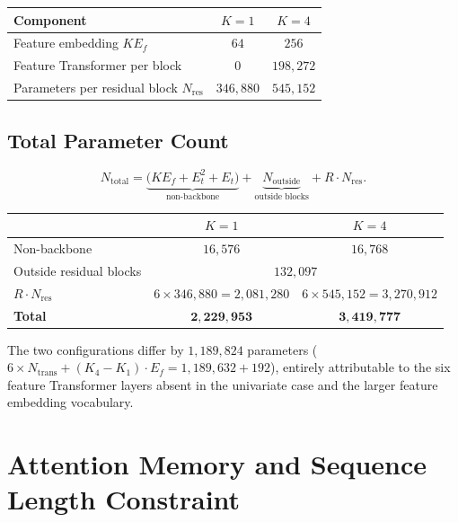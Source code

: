 \begin{table}[h]
\centering
\begin{tabular}{lcc}
\toprule
Component & $K=1$ & $K=4$ \\
\midrule
Feature embedding $K E_f$ & $64$ & $256$ \\
Feature Transformer per block & $0$ & $198{,}272$ \\
\midrule
Parameters per residual block $N_{\mathrm{res}}$ & $346{,}880$ & $545{,}152$ \\
\bottomrule
\end{tabular}
\end{table}

\subsection{Total Parameter Count}

\[
N_{\mathrm{total}}
= \underbrace{\bigl(K E_f + E_t^2 + E_t\bigr)}_{\text{non-backbone}}
+ \underbrace{N_{\mathrm{outside}}}_{\text{outside blocks}}
+ R\cdot N_{\mathrm{res}}.
\]

\begin{table}[h]
\centering
\begin{tabular}{lcc}
\toprule
 & $K=1$ & $K=4$ \\
\midrule
Non-backbone & $16{,}576$ & $16{,}768$ \\
Outside residual blocks & \multicolumn{2}{c}{$132{,}097$} \\
$R \cdot N_{\mathrm{res}}$ & $6\times 346{,}880 = 2{,}081{,}280$ & $6\times 545{,}152 = 3{,}270{,}912$ \\
\midrule
\textbf{Total} & $\mathbf{2{,}229{,}953}$ & $\mathbf{3{,}419{,}777}$ \\
\bottomrule
\end{tabular}
\end{table}

The two configurations differ by $1{,}189{,}824$ parameters
($6 \times N_{\mathrm{trans}} + (K_4 - K_1)\cdot E_f
= 1{,}189{,}632 + 192$),
entirely attributable to the six feature Transformer layers absent in the
univariate case and the larger feature embedding vocabulary.

\section{Attention Memory and Sequence Length Constraint}
\label{app:sec:attention_memory}


